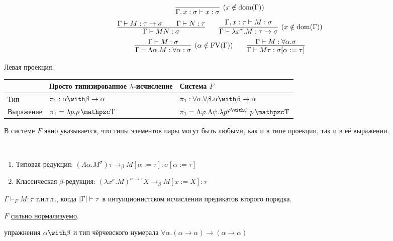 \begin{definition}
    \inferspacing
    \begin{gather*}
        \infer[(x \notin \mathrm{dom}(\Gamma))]{\Gamma, x : \sigma \vdash x : \sigma}{} \\
        \infer{\Gamma \vdash MN : \sigma}{\Gamma \vdash M : \tau \rightarrow \sigma && \Gamma \vdash N : \tau} \qquad
        \infer[(x \notin \mathrm{dom}(\Gamma))]
                {\Gamma \vdash \lambda x^\tau . M : \tau \rightarrow \sigma}{\Gamma, x : \tau \vdash M : \sigma} \\
        \infer[(\alpha \notin \FV(\Gamma))]{\Gamma \vdash \Lambda \alpha . M : \forall \alpha : \sigma}{\Gamma \vdash M : \sigma} \qquad
        \infer{\Gamma \vdash M \tau : \sigma [\alpha := \tau]}{\Gamma \vdash M : \forall \alpha . \sigma}
    \end{gather*}
\end{definition}

\begin{example} Левая проекция:
    \begin{center}
    \begin{tabular}{l l l} \toprule
        & Просто типизированное $\lambda$-исчисление & Система $F$ \\ \midrule
        Тип & $\pi_1:\alpha\with\beta\rightarrow\alpha$ & $\pi_1:\forall \alpha . \forall \beta . \alpha \with \beta \rightarrow \alpha$ \\
        Выражение & $\pi_1 = \lambda p . p \comb T$ & $\pi_1 = \Lambda \varphi . \Lambda \psi . \lambda p^{\varphi\with\psi} . p \comb T$
        \\ \bottomrule
    \end{tabular}
    \end{center}
В системе $F$ явно указывается, что типы элементов пары могут быть любыми, как и в типе проекции, так и в её выражении.
\end{example}

\begin{definition} \ 
    \begin{enumerate}
        \item Типовая редукция: $\left(\Lambda \alpha . M^\sigma\right) \tau \rightarrow_\beta M[\alpha:=\tau] : \sigma[\alpha := \tau]$
        \item Классическая $\beta$-редукция: $\left(\lambda x^\sigma.M\right)^{\sigma\rightarrow\tau} X \rightarrow_\beta M [x:=X] : \tau$
    \end{enumerate}
\end{definition}

\begin{theorem}
    $\Gamma \vdash_F M :\tau$ т.и.т.т., когда $\left|\Gamma\right| \vdash \tau$ в интуиционистском исчислении предикатов второго порядка.
\end{theorem}

\begin{theorem}
    $F$ \hyperref[strong-normalization]{сильно нормализуемо}.
\end{theorem}

\todo упражнения $\alpha\with\beta$ и тип чёрчевского нумерала
$\forall\alpha.(\alpha\rightarrow\alpha)\rightarrow(\alpha\rightarrow\alpha)$
